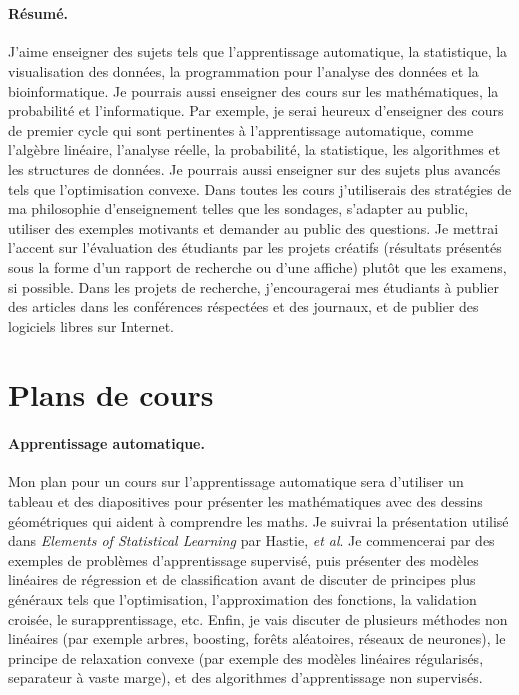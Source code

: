 \documentclass{article}
\begin{document}
 \mbox{ }


\paragraph{Résumé.} J'aime enseigner des sujets tels que
l'apprentissage automatique, la statistique, la visualisation des
données, la programmation pour l'analyse des données et la
bioinformatique. Je pourrais aussi enseigner des cours sur les
mathématiques, la probabilité et l'informatique. Par exemple, je serai
heureux d'enseigner des cours de premier cycle qui sont pertinentes à
l'apprentissage automatique, comme l'algèbre linéaire, l'analyse
réelle, la probabilité, la statistique, les algorithmes et les
structures de données. Je pourrais aussi enseigner sur des sujets plus
avancés tels que l'optimisation convexe. Dans toutes les cours
j'utiliserais des stratégies de ma philosophie d'enseignement telles
que les sondages, s'adapter au public, utiliser des exemples motivants
et demander au public des questions. Je mettrai l'accent sur
l'évaluation des étudiants par les projets créatifs (résultats
présentés sous la forme d'un rapport de recherche ou d'une affiche)
plutôt que les examens, si possible. Dans les projets de recherche,
j'encouragerai mes étudiants à publier des articles dans les
conférences réspectées et des journaux, et de publier des logiciels
libres sur Internet.

\section{Plans de cours}

\paragraph{Apprentissage automatique.} 
Mon plan pour un cours sur l'apprentissage automatique sera d'utiliser
un tableau et des diapositives pour présenter les mathématiques avec
des dessins géométriques qui aident à comprendre les maths. Je suivrai
la présentation utilisé dans \emph{Elements of Statistical Learning}
par Hastie, \emph{et al}. Je commencerai par des exemples de
problèmes d'apprentissage supervisé, puis présenter des modèles
linéaires de régression et de classification avant de discuter de
principes plus généraux tels que l'optimisation, l'approximation des
fonctions, la validation croisée, le surapprentissage, etc. Enfin, je
vais discuter de plusieurs méthodes non linéaires (par exemple arbres,
boosting, forêts aléatoires, réseaux de neurones), le principe de
relaxation convexe (par exemple des modèles linéaires régularisés,
separateur à vaste marge), et des algorithmes d'apprentissage non
supervisés.
\end{document}
